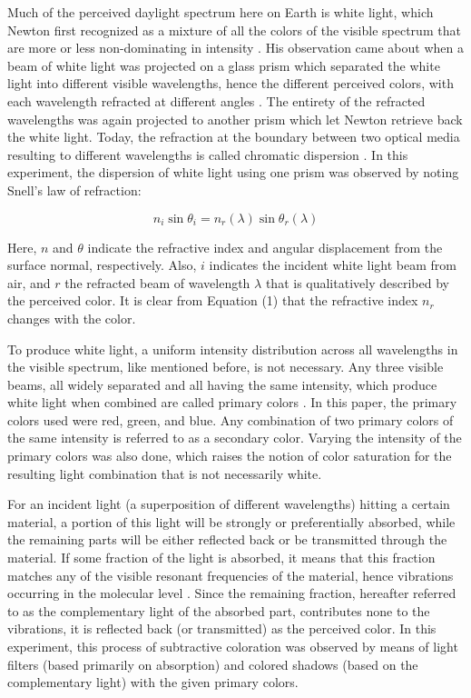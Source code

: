 \documentclass[twoside]{article}
\begin{document}
Much of the perceived daylight spectrum here on Earth is white light, which Newton first recognized as a mixture of all the colors of the visible spectrum that are more or less non-dominating in intensity \cite{Hecht}. His observation came about when a beam of white light was projected on a glass prism which separated the white light into different visible wavelengths, hence the different perceived colors, with each wavelength refracted at different angles \cite{Bauer}.  The entirety of the refracted wavelengths was again projected to another prism which let Newton retrieve back the white light. Today, the refraction at the boundary between two optical media resulting to different wavelengths is called chromatic dispersion \cite{Bauer}. In this experiment, the dispersion of white light using one prism was observed by noting Snell’s law of refraction:

\begin{equation}
n_i \sin{\theta_i} = n_r (\lambda)\sin{\theta_r (\lambda)}
\label{eqn:Snell}
\end{equation}

\noindent Here, $n$ and $\theta$ indicate the refractive index and angular displacement from the surface normal, respectively. Also, $i$ indicates the incident white light beam from air, and $r$ the refracted beam of wavelength $\lambda$ that is qualitatively described by the perceived color. It is clear from Equation (1) that the refractive index $n_r$ changes with the color. 

To produce white light, a uniform intensity distribution across all wavelengths in the visible spectrum, like mentioned before, is not necessary. Any three visible beams, all widely separated and all having the same intensity, which produce white light when combined are called primary colors \cite{Hecht}. In this paper, the primary colors used were red, green, and blue. Any combination of two primary colors of the same intensity is referred to as a secondary color. Varying the intensity of the primary colors was also done, which raises the notion of color saturation for the resulting light combination that is not necessarily white.

For an incident light (a superposition of different wavelengths) hitting a certain material, a portion of this light will be strongly or preferentially absorbed, while the remaining parts will be either reflected back or be transmitted through the material. If some fraction of the light is absorbed, it means that this fraction matches any of the visible resonant frequencies of the material, hence vibrations occurring in the molecular level \cite{Hecht}. Since the remaining fraction, hereafter referred to as the complementary light of the absorbed part, contributes none to the vibrations, it is reflected back (or transmitted) as the perceived color. In this experiment, this process of subtractive coloration was observed by means of light filters (based primarily on absorption) and colored shadows (based on the complementary light) with the given primary colors.
\end{document}
